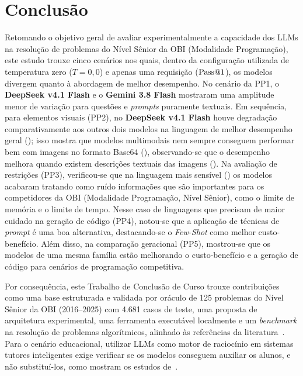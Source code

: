 \chapter{Conclusão}\label{cap:conclusao}

Retomando o objetivo geral de avaliar experimentalmente a capacidade dos LLMs na resolução de problemas do Nível Sênior da OBI (Modalidade Programação), este estudo trouxe cinco cenários nos quais, dentro da configuração utilizada de temperatura zero ($T = 0{,}0$) e apenas uma requisição ($\mathrm{Pass@}1$), os modelos divergem quanto à abordagem de melhor desempenho. No cenário da PP1, o \textbf{DeepSeek v4.1 Flash} e o \textbf{Gemini 3.8 Flash} mostraram uma amplitude menor de variação para questões e \textit{prompts} puramente textuais. Em sequência, para elementos visuais (PP2), no \textbf{DeepSeek v4.1 Flash} houve degradação comparativamente aos outros dois modelos na linguagem de melhor desempenho geral (); isso mostra que modelos multimodais nem sempre conseguem performar bem com imagens no formato Base64 (), observando-se que o desempenho melhora quando existem descrições textuais das imagens (). Na avaliação de restrições (PP3), verificou-se que na linguagem mais sensível () os modelos acabaram tratando como ruído informações que são importantes para os competidores da OBI (Modalidade Programação, Nível Sênior), como o limite de memória e o limite de tempo. Nesse caso de linguagens que precisam de maior cuidado na geração de código (PP4), notou-se que a aplicação de técnicas de \textit{prompt} é uma boa alternativa, destacando-se o \textit{Few-Shot} como melhor custo-benefício. Além disso, na comparação geracional (PP5), mostrou-se que os modelos de uma mesma família estão melhorando o custo-benefício e a geração de código para cenários de programação competitiva.

Por consequência, este Trabalho de Conclusão de Curso trouxe contribuições como uma base estruturada e validada por oráculo de 125 problemas do Nível Sênior da OBI (2016--2025) com 4.681 casos de teste, uma proposta de arquitetura experimental, uma ferramenta executável localmente e um \textit{benchmark} na resolução de problemas algorítmicos, alinhado às referências da literatura~\citep{chen2021evaluating,li2022competition,zheng2025livecodebench,alcantara2025assessing}. Para o cenário educacional, utilizar LLMs como motor de raciocínio em sistemas tutores inteligentes exige verificar se os modelos conseguem auxiliar os alunos, e não substituí-los, como mostram os estudos de~\citet{priyanka2025development,peng2025enhancing}.

